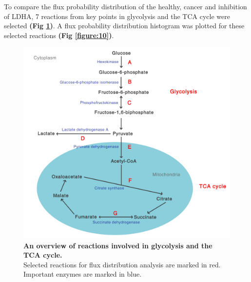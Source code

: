 \documentclass[10pt,letterpaper]{article}
\begin{document}
To compare the flux probability distribution of the healthy, cancer and inhibition of LDHA, 7 reactions from key points in glycolysis and the TCA cycle were selected \textbf{(Fig \ref{figure:9})}. A flux probability distribution histogram was plotted for these selected reactions \textbf{(Fig \ref{figure:10})}.

\begin{figure}
\centering
	\includegraphics[scale=0.52]{fig9.png}
	\caption{\textbf{An overview of reactions involved in glycolysis and the TCA cycle.}
\\ Selected reactions for flux distribution analysis are marked in red. Important enzymes are marked in blue. 
}
\label{figure:9}
\end{figure}
\end{document}
